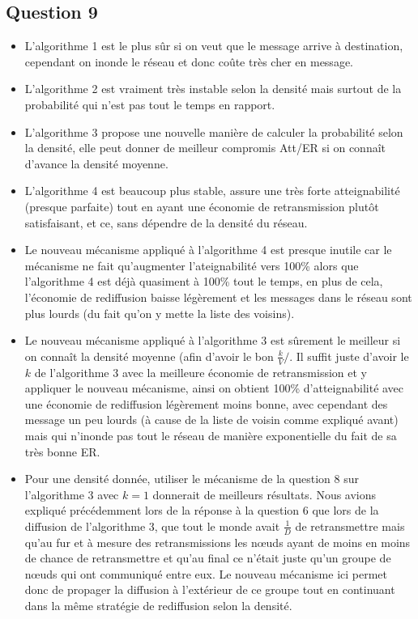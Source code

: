 \documentclass[10pt]{report}
\begin{document}
\newpage
\subsection{Question 9}
\begin{itemize}
\item L’algorithme 1 est le plus sûr si on veut que le message arrive à destination, cependant on inonde le réseau et donc coûte très cher en message.\\
\item L’algorithme 2 est vraiment très instable selon la densité mais surtout de la probabilité qui n’est pas tout le temps en rapport.\\
\item L’algorithme 3 propose une nouvelle manière de calculer la probabilité selon la densité, elle peut  donner de meilleur compromis Att/ER si on connaît d’avance la densité moyenne.\\
\item L’algorithme 4 est beaucoup plus stable, assure une très forte atteignabilité (presque parfaite) tout en ayant une économie de retransmission plutôt satisfaisant, et ce, sans dépendre de la densité du réseau.\\
\item Le nouveau mécanisme appliqué à l’algorithme 4 est presque inutile car le mécanisme ne fait qu’augmenter l’ateignabilité vers 100\% alors que l’algorithme 4 est déjà quasiment à 100\% tout le temps, en plus de cela, l’économie de rediffusion baisse légèrement et les messages dans le réseau sont plus lourds (du fait qu’on y mette la liste des voisins).\\
\item Le nouveau mécanisme appliqué à l’algorithme 3 est sûrement le meilleur si on connaît la densité moyenne (afin d’avoir le bon $\frac{k}{V}/$. Il suffit juste d’avoir le $k$ de l’algorithme 3 avec la meilleure économie de retransmission et y appliquer le nouveau mécanisme, ainsi on obtient 100\% d’atteignabilité avec une économie de rediffusion légèrement moins bonne, avec cependant des message un peu lourds (à cause de la liste de voisin comme expliqué avant) mais qui n’inonde pas tout le réseau de manière exponentielle du fait de sa très bonne ER.\\
\item Pour une densité donnée, utiliser le mécanisme de la question 8 sur l’algorithme 3 avec $k=1$ donnerait de meilleurs résultats. Nous avions expliqué précédemment lors de la réponse à la question 6 que lors de la diffusion de l’algorithme 3, que tout le monde avait $\frac{1}{D}$ de retransmettre mais qu’au fur et à mesure des retransmissions les nœuds ayant de moins en moins de chance de retransmettre et qu’au final ce n’était juste qu’un groupe de nœuds qui ont communiqué entre eux. Le nouveau mécanisme ici permet donc de propager la diffusion à l’extérieur de ce groupe tout en continuant dans la même stratégie de rediffusion selon la densité.
\end{itemize}
\end{document}
